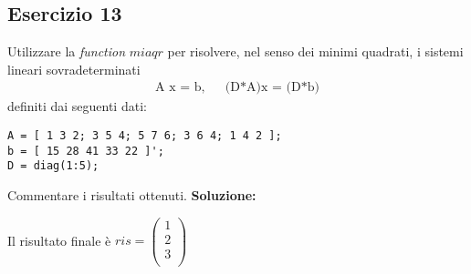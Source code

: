\subsection{Esercizio 13}
Utilizzare la \textit{function} $miaqr$ per risolvere, nel senso dei minimi quadrati,
i sistemi lineari sovradeterminati
\begin{eqnarray*}
    \mbox{A x = b,} & & \mbox{(D*A)x = (D*b)}
\end{eqnarray*}
definiti dai seguenti dati:
\begin{lstlisting}
A = [ 1 3 2; 3 5 4; 5 7 6; 3 6 4; 1 4 2 ];
b = [ 15 28 41 33 22 ]';
D = diag(1:5);
\end{lstlisting}
Commentare i risultati ottenuti.
\newline \textbf{Soluzione:}


Il risultato finale è $ ris =\left(\begin{array}{c}
    1 \\
    2 \\
    3 \\
\end{array}\right)$  

